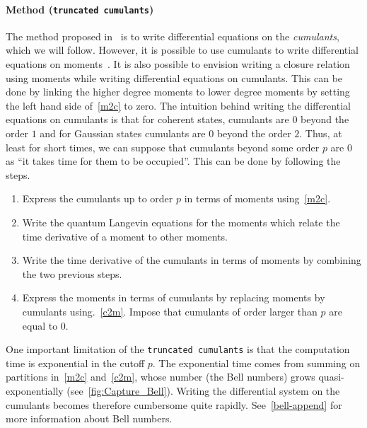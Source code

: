 \paragraph{Method (\texttt{truncated cumulants})} The method proposed in~\cite{khan2021physical} is to write differential equations on the \textit{cumulants}, which we will follow. However, it is possible to use cumulants to write differential equations on moments~\cite{quesada-fast-sum-Gauss, QuantumCumulants}. It is also possible to envision writing a closure relation using moments while writing differential equations on cumulants. This can be done by linking the higher degree moments to lower degree moments by setting the left hand side of~\autoref{m2c} to zero. The intuition behind writing the differential equations on cumulants is that for coherent states, cumulants are $0$ beyond the order $1$ and for Gaussian states cumulants are $0$ beyond the order $2$. Thus, at least for short times, we can suppose that cumulants beyond some order $p$ are $0$ as ``it takes time for them to be occupied''. This can be done by following the steps.

\begin{enumerate}
    \item Express the cumulants up to order $p$ in terms of moments using~\autoref{m2c}.
    \item Write the quantum Langevin equations for the moments which relate the time derivative of a moment to other moments.
    \item Write the time derivative of the cumulants in terms of moments by combining the two previous steps.
    \item Express the moments in terms of cumulants by replacing moments by cumulants using.~\autoref{c2m}. Impose that cumulants of order larger than $p$ are equal to $0$.
\end{enumerate}

One important limitation of the \texttt{truncated cumulants} is that the computation time is exponential in the cutoff $p$. The exponential time comes from summing on partitions in~\autoref{m2c} and~\autoref{c2m}, whose number (the Bell numbers) grows quasi-exponentially (see~\autoref{fig:Capture_Bell}). Writing the differential system on the cumulants becomes therefore cumbersome quite rapidly. See~\autoref{bell-append} for more information about Bell numbers.
